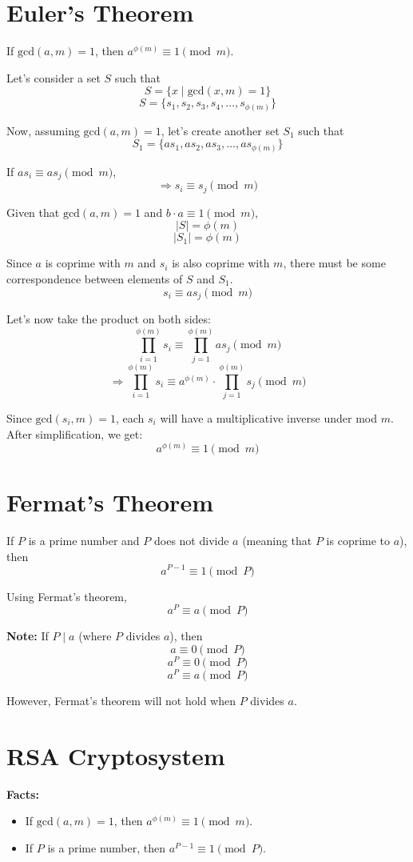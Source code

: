 \documentclass[11pt]{article}
\begin{document}
\section{Euler’s Theorem}
If $\text{gcd}(a, m) = 1$, then $a^{\phi(m)} \equiv 1 \pmod{m}$.

Let's consider a set $S$ such that
\[ S = \{ x \mid \text{gcd}(x, m) = 1 \} \]
\[ S = \{s_1, s_2, s_3, s_4, \ldots, s_{\phi(m)} \} \]

Now, assuming $\text{gcd}(a, m) = 1$, let's create another set $S_1$ such that
\[ S_1 = \{ as_1, as_2, as_3, \ldots, as_{\phi(m)} \} \]

If $as_i \equiv as_j \pmod{m}$,
\[ \Rightarrow s_i \equiv s_j \pmod{m} \]

Given that $\text{gcd}(a, m) = 1$ and $b \cdot a \equiv 1 \pmod{m}$,
\[ |S| = \phi(m) \]
\[ |S_1| = \phi(m) \]

Since $a$ is coprime with $m$ and $s_i$ is also coprime with $m$, there must be some correspondence between elements of $S$ and $S_1$.
\[ s_i \equiv as_j \pmod{m} \]

Let's now take the product on both sides:
\[ \prod_{i=1}^{\phi(m)} s_i \equiv \prod_{j=1}^{\phi(m)} as_j \pmod{m} \]
\[ \Rightarrow \prod_{i=1}^{\phi(m)} s_i \equiv a^{\phi(m)} \cdot \prod_{j=1}^{\phi(m)} s_j \pmod{m} \]

Since $\text{gcd}(s_i, m) = 1$, each $s_i$ will have a multiplicative inverse under mod $m$. After simplification, we get:
\[ a^{\phi(m)} \equiv 1 \pmod{m} \]

\section{Fermat’s Theorem}
If $P$ is a prime number and $P$ does not divide $a$ (meaning that $P$ is coprime to $a$), then
\[ a^{P-1} \equiv 1 \pmod{P} \]

Using Fermat’s theorem,
\[ a^P \equiv a \pmod{P} \]

\textbf{Note:} If $P \mid a$ (where $P$ divides $a$), then
\[ a \equiv 0 \pmod{P} \]
\[ a^P \equiv 0 \pmod{P} \]
\[ a^P \equiv a \pmod{P} \]

However, Fermat’s theorem will not hold when $P$ divides $a$.

\section{RSA Cryptosystem}

\textbf{Facts:}
\begin{itemize}
    \item If $\text{gcd}(a, m) = 1$, then $a^{\phi(m)} \equiv 1 \pmod{m}$.
    \item If $P$ is a prime number, then $a^{P-1} \equiv 1 \pmod{P}$.
\end{itemize}
\end{document}
